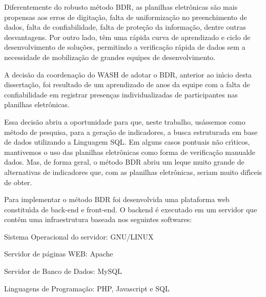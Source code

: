 \documentclass[
12pt,		%
openright,	%
twoside,  %
a4paper,			%
chapter=TITLE,		%
english,			%
french,				%
spanish,			%
brazil				%
]{USPSC-classe/USPSC}
\begin{document}
Diferentemente do robusto m\'etodo BDR, as planilhas eletr\^onicas s\~ao mais propensas aos erros de digita\c{c}\~ao, falta de uniformiza\c{c}\~ao no preenchimento de dados, falta de confiabilidade, falta de prote\c{c}\~ao da informa\c{c}\~ao, dentre outras desvantagens. Por outro lado, t\^em uma r\'apida curva de aprendizado e ciclo de desenvolvimento de solu\c{c}\~oes, permitindo a verifica\c{c}\~ao r\'apida de dados sem a necessidade de mobiliza\c{c}\~ao de grandes equipes de desenvolvimento.










A decis\~ao da coordena\c{c}\~ao do WASH de adotar o BDR, anterior ao in\'{\i}cio desta disserta\c{c}\~ao, foi resultado de um aprendizado de anos da equipe com a falta de confiabilidade em registrar presen\c{c}as individualizadas de participantes nas planilhas eletr\^onicas.










Essa decis\~ao abriu a oportunidade para que, neste trabalho, us\'assemos como m\'etodo de pesquisa, para a gera\c{c}\~ao de indicadores, a busca estruturada em base de dados utilizando a Linguagem SQL. Em alguns casos pontuais n\~ao cr\'{\i}ticos, mantivemos o uso das planilhas eletr\^onicas como forma de verifica\c{c}\~ao \textquotedbl manual\textquotedbl  de dados. Mas, de forma geral, o m\'etodo BDR abriu um leque muito grande de alternativas de indicadores que, com as planilhas eletr\^onicas, seriam muito dif\'{\i}ceis de obter.










Para implementar o m\'etodo BDR foi desenvolvida uma plataforma web constitu\'{\i}da de back-end e front-end. O backend \'e executado em um servidor que cont\'em uma infraestrutura baseada nos seguintes softwares:











\begin{alineas}
\item Sistema Operacional do servidor: GNU/LINUX
\item Servidor de p\'aginas WEB: Apache
\item Servidor de Banco de Dados: MySQL
\item Linguagens de Programa\c{c}\~ao: PHP, Javascript e SQL
\end{alineas}
\end{document}
